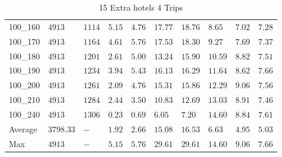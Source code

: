 \begin{center}
\begin{table}[]
\begin{tabular}{|lll|l|l|ll|lll|}
100\_160 & $4913   $   & $1114$ & $5.15$ & $4.76$   & $17.77$    & $18.76$   & $8.65 $& $7.02$   & $7.28$ \\
100\_170 & $4913   $   & $1164$ & $4.61$ & $5.76$   & $17.53$    & $18.30$   & $9.27 $& $7.69$   & $7.37$ \\
100\_180 & $4913   $   & $1201$ & $2.61$ & $5.00$   & $13.24$    & $15.90$   & $10.59$& $8.82$   & $7.51$ \\
100\_190 & $4913   $   & $1234$ & $3.94$ & $5.43$   & $16.13$    & $16.29$   & $11.64$& $8.62$   & $7.66$ \\
100\_200 & $4913   $   & $1261$ & $2.09$ & $4.76$   & $15.31$    & $15.86$   & $12.29$& $9.06$   & $7.56$ \\
100\_210 & $4913   $   & $1284$ & $2.44$ & $3.50$   & $10.83$    & $12.69$   & $13.03$& $8.91$   & $7.46$ \\
100\_240 & $4913   $   & $1306$ & $0.23$ & $0.69$   & $6.05$    & $7.20$   & $14.60$& $8.84$   & $7.61$ \\
\hline
Average  & $3798.33$   & $-   $ & $1.92$ & $2.66$   & $15.08$    & $16.53$   & $6.63 $& $4.95$   & $5.03$ \\
Max      & $4913   $   & $-   $ & $5.15$ & $5.76$   & $29.61$    & $29.61$   & $14.60$& $9.06$   & $7.66$ \\
\hline
\end{tabular}
\caption{15 Extra hotels 4 Trips}
\label{15-4}
\end{table}
\end{center}
